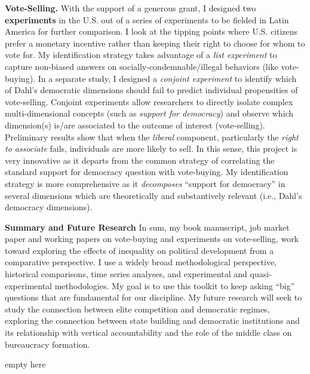 \documentclass[11pt]{letter} %
\begin{document}
\begin{letter}{}
{\bf Vote-Selling.} With the support of a generous grant, I designed two {\bf experiments} in the U.S. out of a series of experiments to be fielded in Latin America for further comparison. I look at the tipping points where U.S. citizens prefer a monetary incentive rather than keeping their right to choose for whom to vote for. My identification strategy takes advantage of a \emph{list experiment} to capture non-biased answers on socially-condemnable/illegal behaviors (like vote-buying). In a separate study, I designed a \emph{conjoint experiment} to identify which of Dahl's democratic dimensions should fail to predict individual propensities of vote-selling. Conjoint experiments allow researchers to directly isolate complex multi-dimensional concepts (such as \emph{support for democracy}) and observe which dimension(s) is/are associated to the outcome of interest (vote-selling). Preliminary results show that when the \emph{liberal} component, particularly the \emph{right to associate} fails, individuals are more likely to sell. In this sense, this project is very innovative as it departs from the common strategy of correlating the standard support for democracy question with vote-buying. My identification strategy is more comprehensive as it \emph{decomposes} ``support for democracy'' in several dimensions which are theoretically and substantively relevant (i.e., Dahl's democracy dimensions). 


{\bf Summary and Future Research} In sum, my book manuscript, job market paper and working papers on vote-buying and experiments on vote-selling, work toward exploring the effects of inequality on political development from a comparative perspective. I use a widely broad methodological perspective, historical comparisons, time series analyses, and experimental and quasi-experimental methodologies. My goal is to use this toolkit to keep asking ``big'' questions that are fundamental for our discipline. My future research will seek to study the connection between elite competition and democratic regimes, exploring the connection between state building and democratic institutions and its relationship with vertical accountability and the role of the middle class on bureaucracy formation.\vspace{-10cm}

\closing{{\color{white}empty here}}


{\color{white}\encl{}}


\end{letter}
\end{document}
